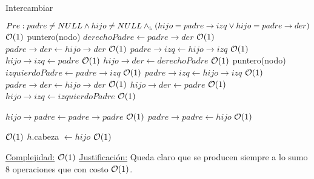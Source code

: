 \begin{Algoritmos}
\begin{algorithm}
\caption{Intercambiar}
\begin{algorithmic}[1]
	\State \Comment $Pre: padre \neq NULL \land hijo \neq NULL \land_{\mathrm{\scriptscriptstyle{L}}} (hijo = padre \to izq \lor hijo = padre \to der)$  
   \Comment $\mathcal{O}(1)$
    \State puntero(nodo) $derechoPadre \gets padre \to der$ \Comment $\mathcal{O}(1)$
    \State $padre \to der \gets hijo \to der$ \Comment $\mathcal{O}(1)$
    \State $padre \to izq \gets hijo \to izq$ \Comment $\mathcal{O}(1)$
    \State $hijo \to izq \gets padre$ \Comment $\mathcal{O}(1)$
    \State $hijo \to der \gets derechoPadre$ \Comment $\mathcal{O}(1)$
  \Else
    \State puntero(nodo) $izquierdoPadre \gets padre \to izq$ \Comment $\mathcal{O}(1)$
    \State $padre \to izq \gets hijo \to izq$ \Comment $\mathcal{O}(1)$
    \State $padre \to der \gets hijo \to der$ \Comment $\mathcal{O}(1)$
    \State $hijo \to der \gets padre$ \Comment $\mathcal{O}(1)$
    \State $hijo \to izq \gets izquierdoPadre$ \Comment $\mathcal{O}(1)$
  \EndIf

  \State $hijo \to padre \gets padre \to padre$ \Comment $\mathcal{O}(1)$
  \State $padre \to padre \gets hijo$ \Comment $\mathcal{O}(1)$
  
   \Comment $\mathcal{O}(1)$
    \State$h$.cabeza $\gets hijo$ \Comment $\mathcal{O}(1)$
  \EndIf 


 \EndProcedure
 \underline{Complejidad:} $\mathcal{O}(1)$
 \underline{Justificación:} Queda claro que se producen siempre a lo sumo 8 operaciones que con costo $\mathcal{O}(1)$.
\end{algorithmic}
\end{algorithm}










\end{Algoritmos}











